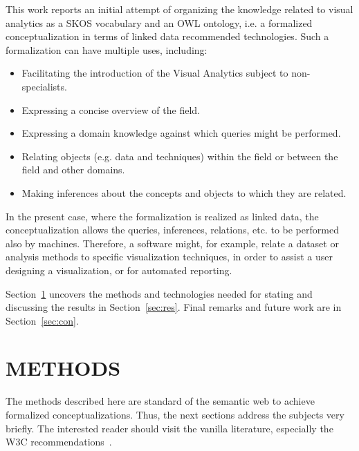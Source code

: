 \documentclass[12pt,fleqn]{article}
\begin{document}
This work reports an initial attempt of organizing the knowledge related to visual analytics
as a SKOS vocabulary and an OWL ontology, i.e. a formalized conceptualization
% 
% 
% 
%
in terms of linked data recommended technologies.
Such a formalization can have multiple uses, including:
\begin{itemize}
	\item Facilitating the introduction of the Visual Analytics subject to non-specialists.
	\item Expressing a concise overview of the field.
	\item Expressing a domain knowledge against which queries might be performed.
% 
% 
% 
%
	\item Relating objects (e.g. data and techniques) within the field or between the field and other domains.
	\item Making inferences about the concepts and objects to which they are related.
\end{itemize}

In the present case, where the formalization is realized as linked data,
the conceptualization allows the queries, inferences, relations, etc.
to be performed also by machines.
Therefore, a software might, for example,  relate a dataset
or analysis methods to specific visualization techniques, in order to assist a user designing a visualization, or
for automated reporting.

Section~\ref{sec:methods} uncovers the methods and technologies
needed for stating and discussing the results in Section~\ref{sec:res}.
Final remarks and future work are in Section~\ref{sec:con}.

\section{METHODS}\label{sec:methods}
The methods described here are standard of the semantic web
to achieve formalized conceptualizations.
Thus, the next sections address the subjects very briefly.
The interested reader should visit the vanilla literature,
especially the W3C recommendations~\citep{w3cld,ldb}.
\end{document}
